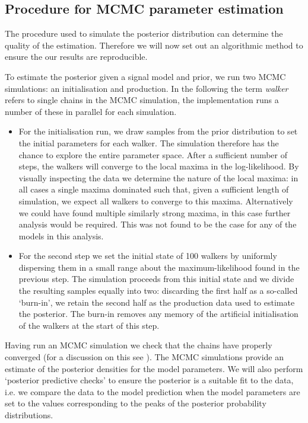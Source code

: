 \documentclass[../full_thesis/full_thesis.tex]{subfiles}
\begin{document}
\begin{subappendices}
\section{Procedure for MCMC parameter estimation}
\label{sec: procedure for the mcmc parameter estimation}

The procedure used to simulate the posterior distribution can determine the
quality of the estimation. Therefore we will now set out an algorithmic method
to ensure the our results are reproducible.

To estimate the posterior given a signal model and prior, we run two MCMC
simulations: an initialisation and production. In the following the term
\emph{walker} refers to single chains in the MCMC simulation, the
\citet{Foreman-Mackay2013} implementation runs a number of these in parallel
for each simulation.

\begin{itemize}

\item For the initialisation run, we draw samples from the prior distribution
to set the initial parameters for each walker. The simulation therefore has the
chance to explore the entire parameter space. After a sufficient number of
steps, the walkers will converge to the local maxima in the log-likelihood. By
visually inspecting the data we determine the nature of the local maxima: in
all cases a single maxima dominated such that, given a sufficient length of
simulation, we expect all walkers to converge to this maxima. Alternatively we
could have found multiple similarly strong maxima, in this case further
analysis would be required. This was not found to be the case for any of the
models in this analysis.

\item For the second step we set the initial state of 100 walkers by uniformly
dispersing them in a small range about the maximum-likelihood found in the
previous step. The simulation proceeds from this initial state and we divide
the resulting samples equally into two: discarding the first half as a
so-called `burn-in', we retain the second half as the production data used to
estimate the posterior.  The burn-in removes any memory of the artificial
initialisation of the walkers at the start of this step.

\end{itemize}

Having run an MCMC simulation we check that the chains have properly converged
(for a discussion on this see \citet{gelman2013bayesian}).  The MCMC
simulations provide an estimate of the posterior densities for the model
parameters. We will also perform `posterior predictive checks' to ensure the
posterior is a suitable fit to the data, i.e. we compare the data to the model
prediction when the model parameters are set to the values corresponding to the
peaks of the posterior probability  distributions.



\end{subappendices}
\end{document}
